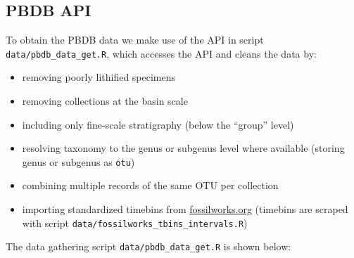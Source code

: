 \documentclass[]{article}
\providecommand{\tightlist}{%
  \setlength{\itemsep}{0pt}\setlength{\parskip}{0pt}}
\begin{document}
\subsection{PBDB API}\label{pbdb-api}

To obtain the PBDB data we make use of the API in script
\texttt{data/pbdb\_data\_get.R}, which accesses the API and cleans the
data by:

\begin{itemize}
\tightlist
\item
  removing poorly lithified specimens
\item
  removing collections at the basin scale
\item
  including only fine-scale stratigraphy (below the ``group'' level)
\item
  resolving taxonomy to the genus or subgenus level where available
  (storing genus or subgenus as \texttt{otu})
\item
  combining multiple records of the same OTU per collection
\item
  importing standardized timebins from \url{fossilworks.org} (timebins
  are scraped with script \texttt{data/fossilworks\_tbins\_intervals.R})
\end{itemize}

The data gathering script \texttt{data/pbdb\_data\_get.R} is shown
below:
\end{document}
